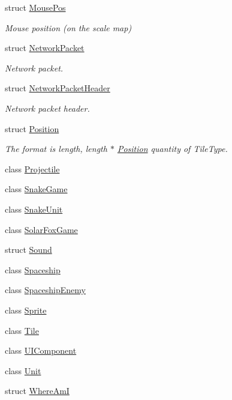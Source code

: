 \begin{DoxyCompactItemize}
struct \hyperlink{structarcade_1_1_mouse_pos}{Mouse\+Pos}
\begin{DoxyCompactList}\small\item\em Mouse position (on the scale map) \end{DoxyCompactList}\item 
struct \hyperlink{structarcade_1_1_network_packet}{Network\+Packet}
\begin{DoxyCompactList}\small\item\em Network packet. \end{DoxyCompactList}\item 
struct \hyperlink{structarcade_1_1_network_packet_header}{Network\+Packet\+Header}
\begin{DoxyCompactList}\small\item\em Network packet header. \end{DoxyCompactList}\item 
struct \hyperlink{structarcade_1_1_position}{Position}
\begin{DoxyCompactList}\small\item\em The format is length, length $\ast$ \hyperlink{structarcade_1_1_position}{Position} quantity of Tile\+Type. \end{DoxyCompactList}\item 
class \hyperlink{classarcade_1_1_projectile}{Projectile}
\item 
class \hyperlink{classarcade_1_1_snake_game}{Snake\+Game}
\item 
class \hyperlink{classarcade_1_1_snake_unit}{Snake\+Unit}
\item 
class \hyperlink{classarcade_1_1_solar_fox_game}{Solar\+Fox\+Game}
\item 
struct \hyperlink{structarcade_1_1_sound}{Sound}
\item 
class \hyperlink{classarcade_1_1_spaceship}{Spaceship}
\item 
class \hyperlink{classarcade_1_1_spaceship_enemy}{Spaceship\+Enemy}
\item 
class \hyperlink{classarcade_1_1_sprite}{Sprite}
\item 
class \hyperlink{classarcade_1_1_tile}{Tile}
\item 
class \hyperlink{classarcade_1_1_u_i_component}{U\+I\+Component}
\item 
class \hyperlink{classarcade_1_1_unit}{Unit}
\item 
struct \hyperlink{structarcade_1_1_where_am_i}{Where\+AmI}
\end{DoxyCompactItemize}
